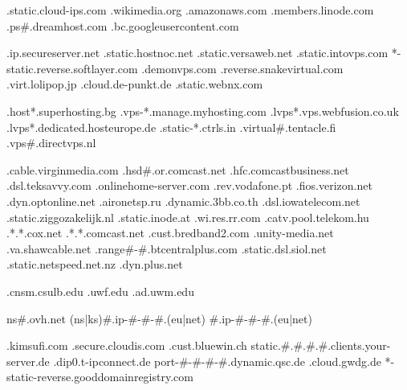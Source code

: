 % 

.static.cloud-ips.com %
.wikimedia.org %
.amazonaws.com %
.members.linode.com %
.ps#.dreamhost.com %
.bc.googleusercontent.com %

.ip.secureserver.net
.static.hostnoc.net
.static.versaweb.net
.static.intovps.com
*-static.reverse.softlayer.com
.demonvps.com
.reverse.snakevirtual.com
.virt.lolipop.jp
.cloud.de-punkt.de
.static.webnx.com

.host*.superhosting.bg
.vps-*.manage.myhosting.com
.lvps*.vps.webfusion.co.uk
.lvps*.dedicated.hosteurope.de
.static-*.ctrls.in
.virtual#.tentacle.fi
.vps#.directvps.nl

.cable.virginmedia.com
.hsd#.or.comcast.net
.hfc.comcastbusiness.net
.dsl.teksavvy.com
.onlinehome-server.com
.rev.vodafone.pt
.fios.verizon.net
.dyn.optonline.net
.aironetsp.ru
.dynamic.3bb.co.th
.dsl.iowatelecom.net
.static.ziggozakelijk.nl
.static.inode.at
.wi.res.rr.com
.catv.pool.telekom.hu
.*.*.cox.net
.*.*.comcast.net
.cust.bredband2.com
.unity-media.net
.va.shawcable.net
.range#-#.btcentralplus.com
.static.dsl.siol.net
.static.netspeed.net.nz
.dyn.plus.net

.cnsm.csulb.edu
.uwf.edu
.ad.uwm.edu

ns#.ovh.net
(ns|ks)#.ip-#-#-#.(eu|net)
#.ip-#-#-#.(eu|net)

.kimsufi.com
.secure.cloudis.com
.cust.bluewin.ch
static.#.#.#.#.clients.your-server.de
.dip0.t-ipconnect.de
port-#-#-#-#.dynamic.qsc.de
.cloud.gwdg.de
*-static-reverse.gooddomainregistry.com
